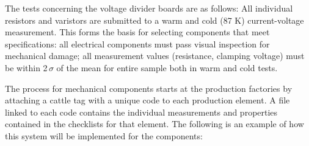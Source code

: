 The  tests concerning the voltage divider boards are as follows: All individual resistors and
 varistors are submitted to a warm and cold (87 K) current-voltage measurement. This forms the basis for selecting components that meet specifications: all
 electrical components must pass visual inspection for mechanical damage; all measurement values (resistance, clamping voltage) must be within 2$\,\sigma$ of the mean for entire sample both in warm and cold tests.

The  process for mechanical components starts at the production factories by attaching a cattle tag with a unique code to each production element.  A file linked to each code contains the individual measurements and properties contained in the  checklists for that element.  The following is an example of how this system will be implemented for the  components:

